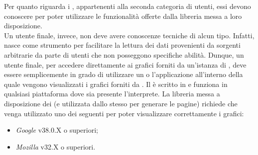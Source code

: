 		Per quanto riguarda i , appartenenti alla seconda categoria di utenti, essi devono conoscere  per poter utilizzare le funzionalità offerte dalla libreria messa a loro disposizione.\\
		Un utente finale, invece, non deve avere conoscenze tecniche di alcun tipo. Infatti,  nasce come strumento per facilitare la lettura dei dati provenienti da sorgenti arbitrarie da parte di utenti che non posseggono specifiche abilità. Dunque, un utente finale, per accedere direttamente ai grafici forniti da un'istanza di , deve essere semplicemente in grado di utilizzare un  o l'applicazione all'interno della quale vengono visualizzati i grafici forniti da .
		Il  è scritto in  e funziona in qualsiasi piattaforma dove sia presente l'interprete.
		La libreria messa a disposizione dei  (e utilizzata dallo stesso  per generare le pagine) richiede che venga utilizzato uno dei seguenti  per poter visualizzare correttamente i grafici:
		\begin{itemize}
			\item \emph{Google } v38.0.X o superiori;
			\item \emph{Mozilla } v32.X o superiori.
		\end{itemize}
